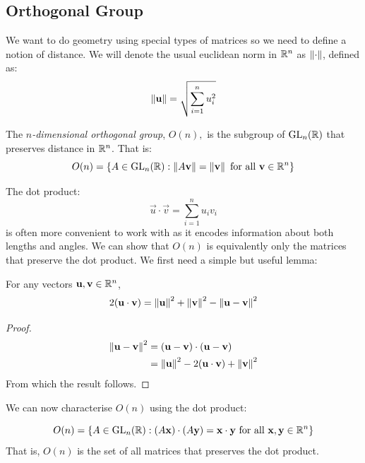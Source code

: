 \documentclass[../main.tex]{subfiles}
\begin{document}
\subsection{Orthogonal Group}
We want to do geometry using special types of matrices so we need to define a notion of distance.
We will denote the usual euclidean norm in $\mathbb{R}^{n}$ as $\left\lVert \cdot \right\rVert$, defined as:
\[
  \left\lVert \mathbf{\bm{u}} \right\rVert = \sqrt{\sum_{i=1}^{n} u^{2}_{i}}
\]
\begin{definition}
  The \textit{$n$-dimensional orthogonal group}, $O(n),$ is the subgroup of $\mathrm{GL}_n(\mathbb{R})$ that preserves distance in $\mathbb{R}^{n}$.
  That is:
  \[
    O(n) = \{A \in \mathrm{GL}_n(\mathbb{R}): \left\lVert A \mathbf{\bm{v}} \right\rVert = \left\lVert \mathbf{\bm{v}} \right\rVert \text{ for all } \mathbf{\bm{v}} \in \mathbb{R}^{n}\}
  \]
\end{definition}
The dot product:
\[
  \vec{u} \cdot \vec{v} = \sum_{i = 1}^{n} u_i v_i
\]
is often more convenient to work with as it encodes information about both lengths and angles.
We can show that $O(n)$ is equivalently only the matrices that preserve the dot product.
We first need a simple but useful lemma:
\begin{lemma}
  For any vectors $\mathbf{\bm{u}}, \mathbf{\bm{v}} \in \mathbb{R}^{n}$,
  \[
    2(\mathbf{\bm{u}} \cdot \mathbf{\bm{v}}) = \left\lVert \mathbf{\bm{u}} \right\rVert^2 + \left\lVert \mathbf{\bm{v}} \right\rVert^2 - \left\lVert \mathbf{\bm{u}} - \mathbf{\bm{v}} \right\rVert^2
  \]
\end{lemma}
\begin{proof}
  \begin{align*}
    \left\lVert \mathbf{\bm{u}} - \mathbf{\bm{v}} \right\rVert^2 &= (\mathbf{\bm{u}} - \mathbf{\bm{v}}) \cdot (\mathbf{\bm{u}} - \mathbf{\bm{v}}) \\
                            &= \left\lVert \mathbf{\bm{u}} \right\rVert^2 - 2(\mathbf{\bm{u}} \cdot \mathbf{\bm{v}}) + \left\lVert \mathbf{\bm{v}} \right\rVert^2
  \end{align*}
  From which the result follows.
\end{proof}
We can now characterise $O(n)$ using the dot product:
\begin{lemma}
  \[
    O(n) = \{A \in \mathrm{GL}_n(\mathbb{R}) : (A\mathbf{\bm{x}}) \cdot (A\mathbf{\bm{y}}) = \mathbf{\bm{x}} \cdot \mathbf{\bm{y}} \text{ for all } \mathbf{\bm{x}}, \mathbf{\bm{y}} \in \mathbb{R}^{n}\}
  \]
  That is, $O(n)$ is the set of all matrices that preserves the dot product.
\end{lemma}
\end{document}
